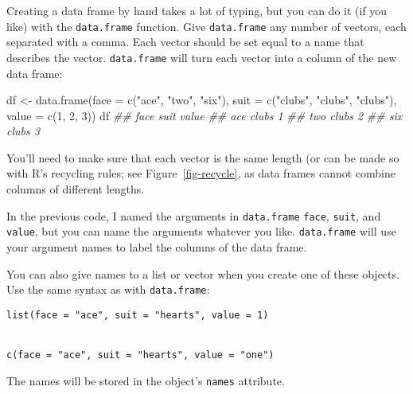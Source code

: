 \documentclass[
  letterpaper,
  DIV=11,
  numbers=noendperiod]{scrbook}
\newenvironment{Shaded}{\begin{snugshade}}{\end{snugshade}}
\newcommand{\AttributeTok}[1]{\textcolor[rgb]{0.40,0.45,0.13}{#1}}
\newcommand{\DecValTok}[1]{\textcolor[rgb]{0.68,0.00,0.00}{#1}}
\newcommand{\DocumentationTok}[1]{\textcolor[rgb]{0.37,0.37,0.37}{\textit{#1}}}
\newcommand{\FunctionTok}[1]{\textcolor[rgb]{0.28,0.35,0.67}{#1}}
\newcommand{\NormalTok}[1]{\textcolor[rgb]{0.00,0.23,0.31}{#1}}
\newcommand{\OtherTok}[1]{\textcolor[rgb]{0.00,0.23,0.31}{#1}}
\newcommand{\StringTok}[1]{\textcolor[rgb]{0.13,0.47,0.30}{#1}}
\begin{document}
Creating a data frame by hand takes a lot of typing, but you can do it
(if you like) with the \texttt{data.frame} function. Give
\texttt{data.frame} any number of vectors, each separated with a comma.
Each vector should be set equal to a name that describes the vector.
\texttt{data.frame} will turn each vector into a column of the new data
frame:

\begin{Shaded}
\begin{Highlighting}[]
\NormalTok{df }\OtherTok{\textless{}{-}} \FunctionTok{data.frame}\NormalTok{(}\AttributeTok{face =} \FunctionTok{c}\NormalTok{(}\StringTok{"ace"}\NormalTok{, }\StringTok{"two"}\NormalTok{, }\StringTok{"six"}\NormalTok{),  }
  \AttributeTok{suit =} \FunctionTok{c}\NormalTok{(}\StringTok{"clubs"}\NormalTok{, }\StringTok{"clubs"}\NormalTok{, }\StringTok{"clubs"}\NormalTok{), }\AttributeTok{value =} \FunctionTok{c}\NormalTok{(}\DecValTok{1}\NormalTok{, }\DecValTok{2}\NormalTok{, }\DecValTok{3}\NormalTok{))}
\NormalTok{df}
\DocumentationTok{\#\# face  suit value}
\DocumentationTok{\#\#  ace clubs     1}
\DocumentationTok{\#\#  two clubs     2}
\DocumentationTok{\#\#  six clubs     3}
\end{Highlighting}
\end{Shaded}

You'll need to make sure that each vector is the same length (or can be
made so with R's recycling rules; see Figure~\ref{fig-recycle}, as data
frames cannot combine columns of different lengths.

In the previous code, I named the arguments in \texttt{data.frame}
\texttt{face}, \texttt{suit}, and \texttt{value}, but you can name the
arguments whatever you like. \texttt{data.frame} will use your argument
names to label the columns of the data frame.

\begin{tcolorbox}[enhanced jigsaw, breakable, colback=white, colbacktitle=quarto-callout-tip-color!10!white, arc=.35mm, bottomrule=.15mm, coltitle=black, left=2mm, rightrule=.15mm, colframe=quarto-callout-tip-color-frame, leftrule=.75mm, opacitybacktitle=0.6, bottomtitle=1mm, toptitle=1mm, titlerule=0mm, opacityback=0, title=\textcolor{quarto-callout-tip-color}{\faLightbulb}\hspace{0.5em}{Names}, toprule=.15mm]

You can also give names to a list or vector when you create one of these
objects. Use the same syntax as with \texttt{data.frame}:

\texttt{list(face\ =\ "ace",\ suit\ =\ "hearts",\ value\ =\ 1)}\strut \\
\texttt{c(face\ =\ "ace",\ suit\ =\ "hearts",\ value\ =\ "one")}

The names will be stored in the object's \texttt{names} attribute.

\end{tcolorbox}
\end{document}
